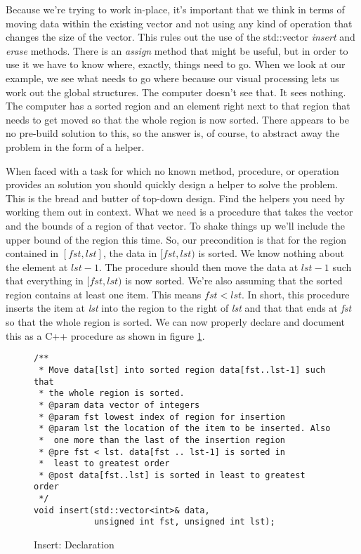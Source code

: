 \documentclass[]{tufte-handout}
\begin{document}
Because we're trying to work in-place, it's important that we think in terms of moving data within the existing vector and not using any kind of operation that changes the size of the vector. This rules out the use of the std::vector \textit{insert} and \textit{erase} methods. There is an \textit{assign} method that might be useful, but in order to use it we have to know where, exactly, things need to go.  When we look at our example, we see what needs to go where because our visual processing lets us work out the global structures. The computer doesn't see that. It sees nothing. The computer has a sorted region and an element right next to that region that needs to get moved so that the whole region is now sorted. There appears to be no pre-build solution to this, so the answer is, of course, to abstract away the problem in the form of a helper. 

When faced with a task for which no known method, procedure, or operation provides an solution you should quickly design a helper to solve the problem. This is the bread and butter of top-down design. Find the helpers you need by working them out in context. What we need is a procedure that takes the vector and the bounds of a region of that vector. To shake things up we'll include the upper bound of the region this time. So, our precondition is that for the region contained in $[fst,lst]$, the data in $[fst,lst)$ is sorted. We know nothing about the element at $lst-1$. The procedure should then move the data at $lst-1$ such that everything in $[fst,lst)$ is now sorted. We're also assuming that the sorted region contains at least one item. This means $fst < lst$. In short, this procedure inserts the item at \textit{lst} into the region to the right of \textit{lst} and that that ends at \textit{fst} so that the whole region is sorted. We can now properly declare and document this as a C++ procedure as shown in figure \ref{code:insertiterdecl}.

\begin{figure}[htbp!]
\begin{lstlisting}
/**
 * Move data[lst] into sorted region data[fst..lst-1] such that
 * the whole region is sorted.
 * @param data vector of integers
 * @param fst lowest index of region for insertion
 * @param lst the location of the item to be inserted. Also
 *  one more than the last of the insertion region
 * @pre fst < lst. data[fst .. lst-1] is sorted in
 *  least to greatest order
 * @post data[fst..lst] is sorted in least to greatest order
 */
void insert(std::vector<int>& data,
   		    unsigned int fst, unsigned int lst);
\end{lstlisting}
\caption{Insert: Declaration}
\label{code:insertiterdecl}
\end{figure}
\end{document}
